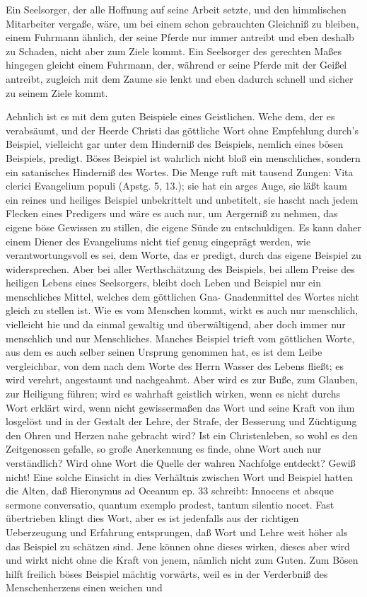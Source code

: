 Ein Seelsorger, der alle Hoffnung auf seine Arbeit setzte, und den himmlischen Mitarbeiter vergaße, wäre, um bei einem schon gebrauchten Gleichniß zu bleiben, einem Fuhrmann ähnlich, der seine Pferde nur immer antreibt und eben deshalb zu Schaden, nicht aber zum Ziele kommt. Ein Seelsorger des gerechten Maßes hingegen gleicht einem Fuhrmann, der, während er seine Pferde mit der Geißel antreibt, zugleich mit dem Zaume sie lenkt und eben dadurch schnell und sicher zu seinem Ziele kommt.

Aehnlich ist es mit dem guten Beispiele eines Geistlichen. Wehe dem, der es verabsäumt, und der Heerde Christi das göttliche Wort ohne Empfehlung durch’s Beispiel, vielleicht gar unter dem Hinderniß des Beispiels, nemlich eines bösen Beispiels, predigt. Böses Beispiel ist wahrlich nicht bloß ein menschliches, sondern ein satanisches Hinderniß des Wortes. Die Menge ruft mit tausend Zungen: Vita clerici Evangelium populi (Apstg. 5, 13.); sie hat ein arges Auge, sie läßt kaum ein reines und heiliges Beispiel unbekrittelt und unbetitelt, sie hascht nach jedem Flecken eines Predigers und wäre es auch nur, um Aergerniß zu nehmen, das eigene böse Gewissen zu stillen, die eigene Sünde zu entschuldigen. Es kann daher einem Diener des Evangeliums nicht tief genug eingeprägt werden, wie verantwortungsvoll es sei, dem Worte, das er predigt, durch das eigene Beispiel zu widersprechen. Aber bei aller Werthschätzung des Beispiels, bei allem Preise des heiligen Lebens eines Seelsorgers, bleibt doch Leben und Beispiel nur ein menschliches Mittel, welches dem göttlichen Gna-
Gnadenmittel des Wortes nicht gleich zu stellen ist. Wie es vom Menschen kommt, wirkt es auch nur menschlich, vielleicht hie und da einmal gewaltig und überwältigend, aber doch immer nur menschlich und nur Menschliches. Manches Beispiel trieft vom göttlichen Worte, aus dem es auch selber seinen Ursprung genommen hat, es ist dem Leibe vergleichbar, von dem nach dem Worte des Herrn Wasser des Lebens fließt; es wird verehrt, angestaunt und nachgeahmt. Aber wird es zur Buße, zum Glauben, zur Heiligung führen; wird es wahrhaft geistlich wirken, wenn es nicht durchs Wort erklärt wird, wenn nicht gewissermaßen das Wort und seine Kraft von ihm losgelöst und in der Gestalt der Lehre, der Strafe, der Besserung und Züchtigung den Ohren und Herzen nahe gebracht wird? Ist ein Christenleben, so wohl es den Zeitgenossen gefalle, so große Anerkennung es finde, ohne Wort auch nur verständlich? Wird ohne Wort die Quelle der wahren Nachfolge entdeckt? Gewiß nicht! Eine solche Einsicht in dies Verhältnis zwischen Wort und Beispiel hatten die Alten, daß Hieronymus ad Oceanum ep. 33 schreibt: Innocens et absque sermone conversatio, quantum exemplo prodest, tantum silentio nocet. Fast übertrieben klingt dies Wort, aber es ist jedenfalls aus der richtigen Ueberzeugung und Erfahrung entsprungen, daß Wort und Lehre weit höher als das Beispiel zu schätzen sind. Jene können ohne dieses wirken, dieses aber wird und wirkt nicht ohne die Kraft von jenem, nämlich nicht zum Guten. Zum Bösen hilft freilich böses Beispiel mächtig vorwärts, weil es in der Verderbniß des Menschenherzens einen weichen und
